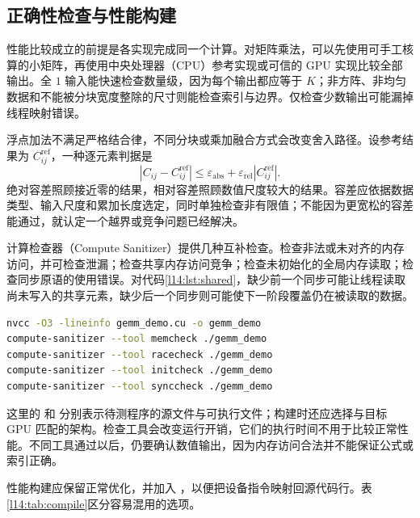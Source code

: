 \subsection{正确性检查与性能构建}

性能比较成立的前提是各实现完成同一个计算。对矩阵乘法，可以先使用可手工核算的小矩阵，再使用中央处理器（CPU）参考实现或可信的 GPU 实现比较全部输出。全 $1$ 输入能快速检查数量级，因为每个输出都应等于 $K$；非方阵、非均匀数据和不能被分块宽度整除的尺寸则能检查索引与边界。仅检查少数输出可能漏掉线程映射错误。

浮点加法不满足严格结合律，不同分块或乘加融合方式会改变舍入路径。设参考结果为 $C^{\mathrm{ref}}_{ij}$，一种逐元素判据是
\begin{equation}
 |C_{ij}-C^{\mathrm{ref}}_{ij}|
 \leq \varepsilon_{\mathrm{abs}}+
       \varepsilon_{\mathrm{rel}}|C^{\mathrm{ref}}_{ij}|.
 \label{l14:eq:validation}
\end{equation}
绝对容差照顾接近零的结果，相对容差照顾数值尺度较大的结果。容差应依据数据类型、输入尺度和累加长度选定，同时单独检查非有限值；不能因为更宽松的容差能通过，就认定一个越界或竞争问题已经解决。

计算检查器（Compute Sanitizer）提供几种互补检查。检查非法或未对齐的内存访问，并可检查泄漏；检查共享内存访问竞争；检查未初始化的全局内存读取；检查同步原语的使用错误。对代码\ref{l14:lst:shared}，缺少前一个同步可能让线程读取尚未写入的共享元素，缺少后一个同步则可能使下一阶段覆盖仍在被读取的数据。

\noindent\begin{minipage}{\linewidth}
\begin{lstlisting}[style=cuda,language=bash,numbers=none,caption={构建待测程序并分别运行正确性工具}]
nvcc -O3 -lineinfo gemm_demo.cu -o gemm_demo
compute-sanitizer --tool memcheck ./gemm_demo
compute-sanitizer --tool racecheck ./gemm_demo
compute-sanitizer --tool initcheck ./gemm_demo
compute-sanitizer --tool synccheck ./gemm_demo
\end{lstlisting}
\end{minipage}

这里的  和  分别表示待测程序的源文件与可执行文件；构建时还应选择与目标 GPU 匹配的架构。检查工具会改变运行开销，它们的执行时间不用于比较正常性能。不同工具通过以后，仍要确认数值输出，因为内存访问合法并不能保证公式或索引正确。

性能构建应保留正常优化，并加入 ，以便把设备指令映射回源代码行。表\ref{l14:tab:compile}区分容易混用的选项。

